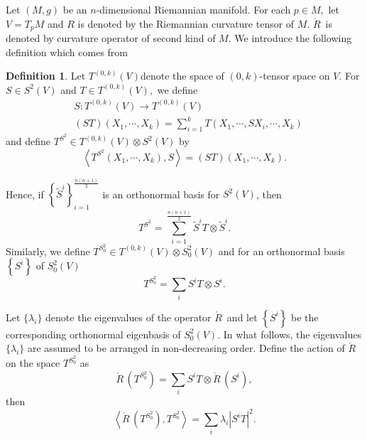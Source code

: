 \documentclass[11pt, reqno]{amsart}
\numberwithin{equation}{section}
\theoremstyle{definition}
\newtheorem{definition}[thm]{Definition}
\begin{document}
	
	Let $(M,g)$ be an $n$-dimensional Riemannian manifold.  For each $p\in M,$ let $V = T_pM$ and $R$ is denoted by the Riemannian curvature tensor of $M$. $\mathring{R}\,$ is denoted by curvature operator of second kind of $M$. We introduce the following definition which comes from \cite{NP}
	\begin{definition}
		Let $T^{(0,k)}(V)$denote the space of $(0,k)$-tensor space on $V$. For $S\in S^2(V)$ and $T\in T^{(0,k)}(V),$ we define
		\begin{align*}
			& S:T^{(0,k)}(V)\to T^{(0,k)}(V) \\ 
			& (ST)(X_1,\cdots ,X_k)=\sum\limits_{i=1}^{k}{T(X_1,\cdots ,SX_i,\cdots ,X_k)} 
		\end{align*}
		and define $T^{S^2}\in T^{(0,k)}(V)\otimes S^2(V)$ by
		$$\left\langle T^{S^2}(X_1,\cdots ,X_k),S \right\rangle =(ST)(X_1,\cdots ,X_k).$$
	\end{definition} 
	Hence, if $\left\{ {\tilde{S}}^i \right\}_{i=1}^{\frac{n(n+1)}{2}}$ is an orthonormal basis for $S^2(V)$, then
	\[T^{S^2}=\sum\limits_{i=1}^{\frac{n(n+1)}{2}}{{\tilde{S}}^iT\otimes {\tilde{S}}^i}.\]
	Similarly, we define $T^{S_{0}^2}\in T^{(0,k)}(V)\otimes S_{0}^{2}(V)$ and for an orthonormal basis $\left\{ S^i \right\}$ of $S_{0}^2(V)$
	$$T^{S_{0}^2}=\sum\limits_{i}{S^iT\otimes S^i}.$$
	
	
	Let $\{{\lambda }_i\}$ denote the eigenvalues of the operator $\mathring{R}\,$  and let $\left\{ S^i \right\}$ be the corresponding orthonormal eigenbasis of $S_{0}^2(V)$. In what follows, the eigenvalues $\{{\lambda}_i\}$ are assumed to be arranged in non‑decreasing order. Define the action of $\mathring{R}\,$ on the space $T^{S_{0}^{2}}$ as
	\[\mathring{R}\,(T^{S_{0}^{2}})=\sum\limits_{i}{S^iT\otimes \mathring{R}\,(S^i),}\]
	then
	\[\left\langle \mathring{R}\,(T^{S_{0}^{2}}),T^{S_{0}^{2}} \right\rangle =\sum\limits_{i}{{\lambda }_i\left| S^iT \right|^2}.\]
	
\end{document}
